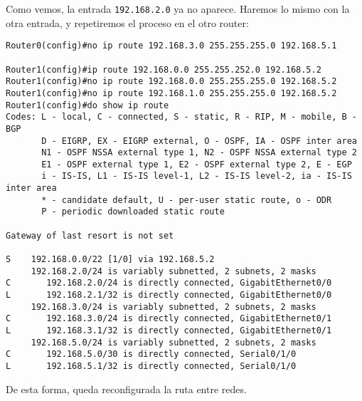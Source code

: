 \documentclass{article}
\begin{document}
Como vemos, la entrada \texttt{192.168.2.0} ya no aparece. Haremos lo mismo con la otra entrada, y repetiremos el proceso en el otro router: \\
\begin{verbatim}
Router0(config)#no ip route 192.168.3.0 255.255.255.0 192.168.5.1

Router1(config)#ip route 192.168.0.0 255.255.252.0 192.168.5.2
Router1(config)#no ip route 192.168.0.0 255.255.255.0 192.168.5.2
Router1(config)#no ip route 192.168.1.0 255.255.255.0 192.168.5.2
Router1(config)#do show ip route
Codes: L - local, C - connected, S - static, R - RIP, M - mobile, B - BGP
       D - EIGRP, EX - EIGRP external, O - OSPF, IA - OSPF inter area
       N1 - OSPF NSSA external type 1, N2 - OSPF NSSA external type 2
       E1 - OSPF external type 1, E2 - OSPF external type 2, E - EGP
       i - IS-IS, L1 - IS-IS level-1, L2 - IS-IS level-2, ia - IS-IS inter area
       * - candidate default, U - per-user static route, o - ODR
       P - periodic downloaded static route

Gateway of last resort is not set

S    192.168.0.0/22 [1/0] via 192.168.5.2
     192.168.2.0/24 is variably subnetted, 2 subnets, 2 masks
C       192.168.2.0/24 is directly connected, GigabitEthernet0/0
L       192.168.2.1/32 is directly connected, GigabitEthernet0/0
     192.168.3.0/24 is variably subnetted, 2 subnets, 2 masks
C       192.168.3.0/24 is directly connected, GigabitEthernet0/1
L       192.168.3.1/32 is directly connected, GigabitEthernet0/1
     192.168.5.0/24 is variably subnetted, 2 subnets, 2 masks
C       192.168.5.0/30 is directly connected, Serial0/1/0
L       192.168.5.1/32 is directly connected, Serial0/1/0

\end{verbatim}

De esta forma, queda reconfigurada la ruta entre redes. \\
\end{document}
